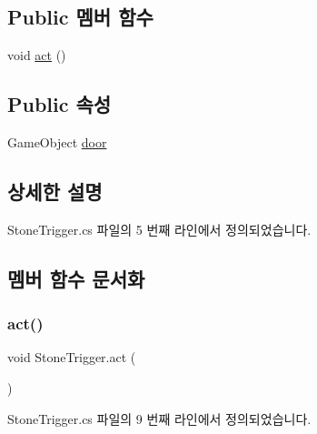\subsection*{Public 멤버 함수}
\begin{DoxyCompactItemize}
\item 
void \mbox{\hyperlink{class_stone_trigger_a9fba11287c1214b79f92784c7d98c5b1}{act}} ()
\end{DoxyCompactItemize}
\subsection*{Public 속성}
\begin{DoxyCompactItemize}
\item 
Game\+Object \mbox{\hyperlink{class_stone_trigger_a1ca819ff116e4a5ce3d56fc7c973f3fc}{door}}
\end{DoxyCompactItemize}


\subsection{상세한 설명}


Stone\+Trigger.\+cs 파일의 5 번째 라인에서 정의되었습니다.



\subsection{멤버 함수 문서화}
\mbox{\label{class_stone_trigger_a9fba11287c1214b79f92784c7d98c5b1}} 
\subsubsection{\texorpdfstring{act()}{act()}}
{\footnotesize\ttfamily void Stone\+Trigger.\+act (\begin{DoxyParamCaption}{ }\end{DoxyParamCaption})}



Stone\+Trigger.\+cs 파일의 9 번째 라인에서 정의되었습니다.


\begin{DoxyCode}{0}

\end{DoxyCode}


